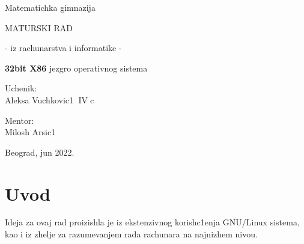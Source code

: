 \documentclass[a4paper,fleqn,12pt]{JMThesis}
\newcommand\eng{\fontencoding{OT1}\fontfamily{\rmdefault}\selectfont}
\begin{document}
\thispagestyle{empty}

\begin{center}
{\matematicka Matematichka gimnazija}
\end{center}
\vspace*{50mm}

\begin{center}
{\maturski MATURSKI RAD}

\vspace*{8pt}
{\naslov - iz rachunarstva i informatike -}
\end{center}

\vspace*{10pt}
\begin{center}
    {\naslov \textbf{\eng\Large 32bit X86} jezgro operativnog sistema}
\end{center}

\vspace*{70mm}
\setlength{\columnsep}{50pt}
\begin{multicols}{2}
 {\noindent \imen Uchenik:
\\Aleksa Vuchkovic1  $\operatorname{IV}$c}


{ \noindent \hfill \imen Mentor:\\
\hfill \phantom{aaaaaaaa} Milosh Arsic1}
\end{multicols}

\vfill
\begin{center}
{\imen Beograd, jun 2022.}
\end{center}
\clearpage

\thispagestyle{empty}
\mbox{}
\clearpage


\renewcommand{\contentsname}{Sadrzhaj}
\thispagestyle{empty}


\tableofcontents \clearpage

\renewcommand{\chaptername}{}
\setcounter{page}{1}

\chapter{Uvod}
\bigskip

Ideja za ovaj rad proizishla je iz ekstenzivnog korish\/c1enja {\eng GNU/Linux}
sistema, kao i iz zhelje za razumevanjem rada rachunara na najnizhem nivou.\\
\end{document}
